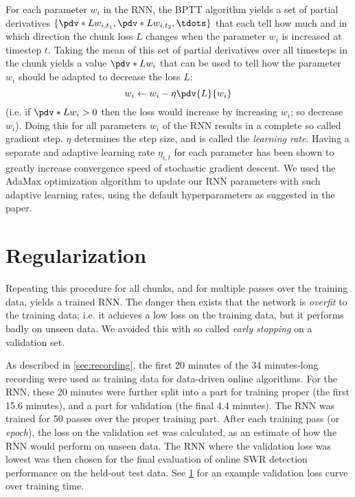 For each parameter $w_i$ in the RNN, the BPTT algorithm yields a set of partial derivatives $\{ \pdv*{L}{w_{i,t_1}}, \pdv*{L}{w_{i,t_2}}, \tdots \}$ that each tell how much and in which direction the chunk loss $L$ changes when the parameter $w_i$ is increased at timestep $t$. Taking the mean of this set of partial derivatives over all timesteps in the chunk yields a value $\pdv*{L}{w_i}$ that can be used to tell how the parameter $w_i$ should be adapted to decrease the loss $L$:
%
\begin{equation}
\label{eq:SGD}
w_i \leftarrow w_i - \eta \pdv{L}{w_i}
\end{equation}
%
(i.e. if $\pdv*{L}{w_i} > 0$ then the loss would increase by increasing $w_i$; so decrease $w_i$). Doing this for all parameters $w_i$ of the RNN results in a complete so called gradient step. $\eta$ determines the step size, and is called the \emph{learning rate}. Having a separate and adaptive learning rate $\eta_{i,t}$ for each parameter has been shown to greatly increase convergence speed of stochastic gradient descent. We used the AdaMax optimization algorithm \cite{Kingma2014} to update our RNN parameters with such adaptive learning rates, using the default hyperparameters as suggested in the paper.



\section{Regularization}
\label{sec:RNN-regularization}

Repeating this procedure for all chunks, and for multiple passes over the training data, yields a trained RNN. The danger then exists that the network is \emph{overfit} to the training data; i.e. it achieves a low loss on the training data, but it performs badly on unseen data. We avoided this with so called \emph{early stopping} on a validation set.

As described in \cref{sec:recording}, the first 20 minutes of the 34 minutes-long recording were used as training data for data-driven online algorithms. For the RNN, these 20 minutes were further split into a part for training proper (the first 15.6 minutes), and a part for validation (the final 4.4 minutes). The RNN was trained for 50 passes over the proper training part. After each training pass (or \emph{epoch}), the loss on the validation set was calculated, as an estimate of how the RNN would perform on unseen data. The RNN where the validation loss was lowest was then chosen for the final evaluation of online SWR detection performance on the held-out test data. See \cref{fig:validloss} for an example validation loss curve over training time.

\begin{figure}
\label{fig:validloss}
\end{figure}

